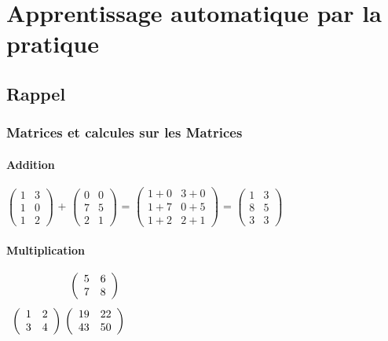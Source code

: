 \part{Apprentissage automatique par la pratique}
\pagebreak

\chapter{Rappel}
\section{Matrices et calcules sur les Matrices}

\subsection{Addition}

$\left(\begin{array}{cc}
1 & 3 \\ 1 & 0 \\ 1 & 2 \end{array} \right)$
+
$\left(\begin{array}{cc}
0 & 0 \\ 7 & 5 \\ 2 & 1 \end{array} \right) $
=
$\left(\begin{array}{cc}
1+0 & 3+0 \\ 1+7 & 0+5 \\ 1+2 & 2+1 \end{array} \right) $
=
$\left(\begin{array}{cc}
1 & 3 \\ 8 & 5 \\ 3 & 3 \end{array} \right) $

\subsection{Multiplication}

$\begin{array}{c@{\ }c}
&
\left(\begin{array}{cc}
5 & 6 \\ 7 & 8 \end{array} \right) \\[0.5cm]
\left(\begin{array}{cc}
1 & 2 \\ 3 & 4 \end{array} \right)
&
\left(\begin{array}{cc}
19 & 22 \\ 43 & 50 \end{array} \right)
\end{array}$

